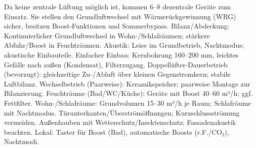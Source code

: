 \markdownRendererDocumentBegin
\markdownRendererSectionBegin
{}\markdownRendererInterblockSeparator
{}Da keine zentrale Lüftung möglich ist, kommen 6–8 dezentrale Geräte zum Einsatz. Sie stellen den Grundluftwechsel mit Wärmerückgewinnung (WRG) sicher, besitzen Boost‑Funktionen und Sommerbypass.\markdownRendererInterblockSeparator
{}\markdownRendererSectionBegin
{}\markdownRendererInterblockSeparator
{}\markdownRendererUlBeginTight
\markdownRendererUlItem Bilanz/Abdeckung: Kontinuierlicher Grundluftwechsel in Wohn‑/Schlafräumen; stärkere Abfuhr/Boost in Feuchträumen.\markdownRendererUlItemEnd 
\markdownRendererUlItem Akustik: Leise im Grundbetrieb, Nachtmodus; akustische Einbauteile.\markdownRendererUlItemEnd 
\markdownRendererUlItem Einfacher Einbau: Kernbohrung 160–200 mm, leichtes Gefälle nach außen (Kondensat), Filterzugang.\markdownRendererUlItemEnd 
\markdownRendererUlEndTight \markdownRendererInterblockSeparator
{}
\markdownRendererSectionEnd \markdownRendererSectionBegin
{}\markdownRendererInterblockSeparator
{}\markdownRendererUlBeginTight
\markdownRendererUlItem Doppellüfter‑Dauerbetrieb (bevorzugt): gleichzeitige Zu‑/Abluft über kleinen Gegenstromkern; stabile Luftbilanz.\markdownRendererUlItemEnd 
\markdownRendererUlItem Wechselbetrieb (Paarweise): Keramikspeicher; paarweise Montage zur Bilanzierung.\markdownRendererUlItemEnd 
\markdownRendererUlEndTight \markdownRendererInterblockSeparator
{}
\markdownRendererSectionEnd \markdownRendererSectionBegin
{}\markdownRendererInterblockSeparator
{}\markdownRendererUlBeginTight
\markdownRendererUlItem Feuchträume (Bad/WC/Küche): Geräte mit Boost 40–60 m³/h; ggf. Fettfilter.\markdownRendererUlItemEnd 
\markdownRendererUlItem Wohn‑/Schlafräume: Grundvolumen 15–30 m³/h je Raum; Schlafräume mit Nachtmodus.\markdownRendererUlItemEnd 
\markdownRendererUlItem Türunterkanten/Überströmöffnungen; Kurzschlussströmung vermeiden.\markdownRendererUlItemEnd 
\markdownRendererUlItem Außenhauben mit Wetterschutz/Insektenschutz; Fassadenakustik beachten.\markdownRendererUlItemEnd 
\markdownRendererUlEndTight \markdownRendererInterblockSeparator
{}
\markdownRendererSectionEnd \markdownRendererSectionBegin
{}\markdownRendererInterblockSeparator
{}\markdownRendererUlBeginTight
\markdownRendererUlItem Lokal: Taster für Boost (Bad), automatische Boosts (r.F./CO₂), Nachtmodi.\markdownRendererUlItemEnd 
